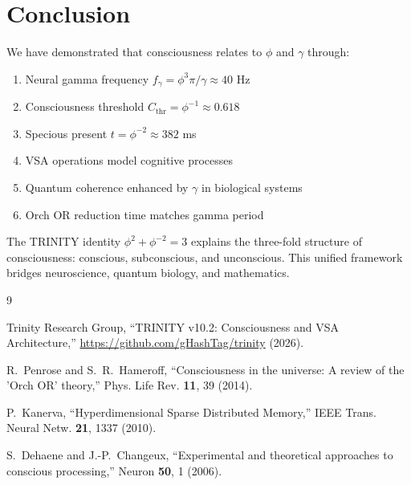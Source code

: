 \documentclass[12pt,a4paper]{article}
\begin{document}
\section{Conclusion}

We have demonstrated that consciousness relates to $\phi$ and $\gamma$ through:
\begin{enumerate}
\item Neural gamma frequency $f_\gamma = \phi^3\pi/\gamma \approx 40$ Hz
\item Consciousness threshold $C_{\text{thr}} = \phi^{-1} \approx 0.618$
\item Specious present $t = \phi^{-2} \approx 382$ ms
\item VSA operations model cognitive processes
\item Quantum coherence enhanced by $\gamma$ in biological systems
\item Orch OR reduction time matches gamma period
\end{enumerate}

The TRINITY identity $\phi^2 + \phi^{-2} = 3$ explains the three-fold structure of consciousness: conscious, subconscious, and unconscious. This unified framework bridges neuroscience, quantum biology, and mathematics.

\begin{thebibliography}{9}

Trinity Research Group,
``TRINITY v10.2: Consciousness and VSA Architecture,''
\url{https://github.com/gHashTag/trinity} (2026).

R.~Penrose and S.~R.~Hameroff,
``Consciousness in the universe: A review of the 'Orch OR' theory,''
Phys. Life Rev. \textbf{11}, 39 (2014).

P.~Kanerva,
``Hyperdimensional Sparse Distributed Memory,''
IEEE Trans. Neural Netw. \textbf{21}, 1337 (2010).

S.~Dehaene and J.-P.~Changeux,
``Experimental and theoretical approaches to conscious processing,''
Neuron \textbf{50}, 1 (2006).

\end{thebibliography}
\end{document}
